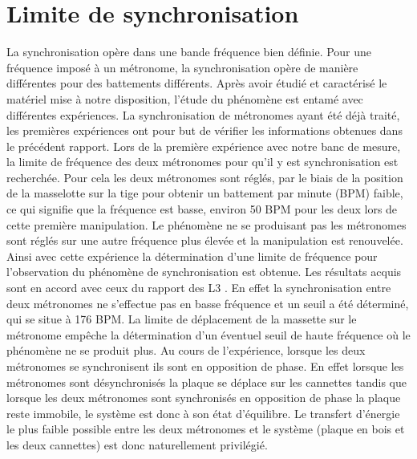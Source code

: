 \documentclass[a4paper,11pt]{report}
\begin{document}
\section{Limite de synchronisation}
La synchronisation opère dans une bande fréquence bien définie. Pour une fréquence imposé à un métronome, la synchronisation opère de manière différentes pour des battements différents. Après avoir étudié et caractérisé le matériel mise à notre disposition, l'étude du phénomène est entamé avec différentes expériences. La synchronisation de métronomes ayant été déjà traité, les premières expériences ont pour but de vérifier les informations obtenues dans le précédent rapport. Lors de la première expérience avec notre banc de mesure, la limite de fréquence des deux métronomes pour qu'il y est synchronisation est recherchée. Pour cela les deux métronomes sont réglés, par le biais de la position de la masselotte sur la tige pour obtenir un battement par minute (BPM) faible, ce qui signifie que la fréquence est basse, environ 50 BPM pour les deux lors de cette première manipulation. Le phénomène ne se produisant pas les métronomes sont réglés sur une autre fréquence plus élevée et la manipulation est renouvelée. Ainsi avec cette expérience la détermination d'une limite de fréquence pour l'observation du phénomène de synchronisation est obtenue. Les résultats acquis sont en accord avec ceux du rapport des L3 \cite{ram}. En effet la synchronisation entre deux métronomes ne s'effectue pas en basse fréquence et un seuil a été déterminé, qui se situe à 176 BPM. La limite de déplacement de la massette sur le métronome empêche la détermination d'un éventuel seuil de haute fréquence où le phénomène ne se produit plus. Au cours de l'expérience, lorsque les deux métronomes se synchronisent ils sont en opposition de phase. En effet lorsque les métronomes sont désynchronisés la plaque se déplace sur les cannettes tandis que lorsque les deux métronomes sont synchronisés en opposition de phase la plaque reste immobile, le système est donc à son état d'équilibre. Le transfert d'énergie le plus faible possible entre les deux métronomes et le système (plaque en bois et les deux cannettes) est donc naturellement privilégié.
\end{document}
